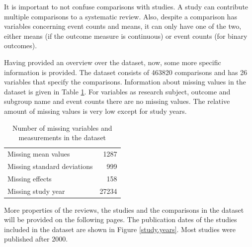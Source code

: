 \documentclass[11pt,a4paper,twoside]{book}\usepackage[]{graphicx}\usepackage[]{color}
\begin{document}


It is important to not confuse comparisons with studies. A study can contribute multiple comparisons to a systematic review. Also, despite a comparison has variables concerning event counts and means, it can only have one of the two, either means (if the outcome measure is continuous) or event counts (for binary outcomes).

\vspace{0mm}
Having provided an overview over the dataset, now, some more specific information is provided. The dataset consists of 463820 comparisons and has 26 variables that specify the comparisons. Information about missing values in the dataset is given in Table \ref{missing}. For variables as research subject, outcome and subgroup name and event counts there are no missing values. The relative amount of missing values is very low except for study years.



\begin{table}[ht]
\centering
\begingroup\footnotesize
\begin{tabular}{lr}
  \hline
  \hline
Missing mean values & 1287 \\ 
  Missing standard deviations & 999 \\ 
  Missing effects & 158 \\ 
  Missing study year & 27234 \\ 
   \hline
\end{tabular}
\endgroup
\caption{Number of missing variables and measurements in the dataset} 
\label{missing}
\end{table}



More properties of the reviews, the studies and the comparisons in the dataset will be provided on the following pages. The publication dates of the studies included in the dataset are shown in Figure \ref{study.years}. Most studies were published after 2000.
\end{document}
